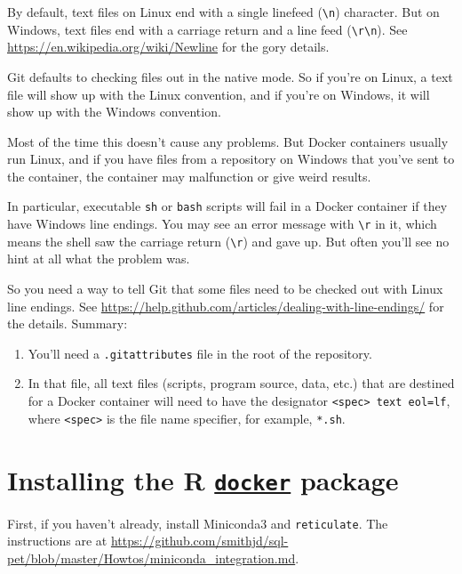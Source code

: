 \documentclass[]{book}
\providecommand{\tightlist}{%
  \setlength{\itemsep}{0pt}\setlength{\parskip}{0pt}}
\theoremstyle{definition}
\theoremstyle{definition}
\theoremstyle{definition}
\theoremstyle{remark}
\begin{document}
By default, text files on Linux end with a single linefeed
(\texttt{\textbackslash{}n}) character. But on Windows, text files end
with a carriage return and a line feed
(\texttt{\textbackslash{}r\textbackslash{}n}). See
\url{https://en.wikipedia.org/wiki/Newline} for the gory details.

Git defaults to checking files out in the native mode. So if you're on
Linux, a text file will show up with the Linux convention, and if you're
on Windows, it will show up with the Windows convention.

Most of the time this doesn't cause any problems. But Docker containers
usually run Linux, and if you have files from a repository on Windows
that you've sent to the container, the container may malfunction or give
weird results.

In particular, executable \texttt{sh} or \texttt{bash} scripts will fail
in a Docker container if they have Windows line endings. You may see an
error message with \texttt{\textbackslash{}r} in it, which means the
shell saw the carriage return (\texttt{\textbackslash{}r}) and gave up.
But often you'll see no hint at all what the problem was.

So you need a way to tell Git that some files need to be checked out
with Linux line endings. See
\url{https://help.github.com/articles/dealing-with-line-endings/} for
the details. Summary:

\begin{enumerate}
\def\labelenumi{\arabic{enumi}.}
\tightlist
\item
  You'll need a \texttt{.gitattributes} file in the root of the
  repository.
\item
  In that file, all text files (scripts, program source, data, etc.)
  that are destined for a Docker container will need to have the
  designator \texttt{\textless{}spec\textgreater{}\ text\ eol=lf}, where
  \texttt{\textless{}spec\textgreater{}} is the file name specifier, for
  example, \texttt{*.sh}.
\end{enumerate}

\hypertarget{installing-the-r-docker-package}{%
\section{\texorpdfstring{Installing the R
\href{https://bhaskarvk.github.io/docker/}{\texttt{docker}}
package}{Installing the R docker package}}\label{installing-the-r-docker-package}}

First, if you haven't already, install Miniconda3 and
\texttt{reticulate}. The instructions are at
\url{https://github.com/smithjd/sql-pet/blob/master/Howtos/miniconda_integration.md}.
\end{document}
